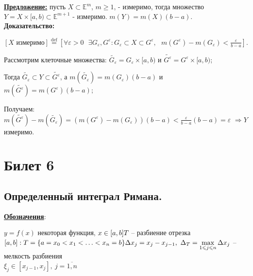 \documentclass[a4paper,12pt]{article} %
\renewcommand {\leq}{\leqslant}
\begin{document}
	\underline{\textbf{Предложение:}} пусть $X \subset \mathbb{E}^m$, $m \geqslant 1$, - измеримо, тогда множество $Y = X\times [a, b) \subset \mathbb{E}^{m + 1}$ - измеримо. $m(Y) = m(X)(b - a)$.\\
	
	\textbf{Доказательство:}
	
	$\left[X \text{ измеримо}\right] \stackrel{\text{def}}{=} \left[\forall \varepsilon > 0\text{ }\exists G_{\varepsilon}, G^{\varepsilon}: G_{\varepsilon}\subset X\subset G^{\varepsilon}, \text{ } m(G^{\varepsilon}) - m(G_{\varepsilon}) < \frac{\varepsilon}{b - a}\right]$.
	
	\vspace{2mm}
	
	Рассмотрим клеточные множества: $\widetilde{G_{\varepsilon}} = G_{\varepsilon}\times [a, b)$ и $\widetilde{G^{\varepsilon}} = G^{\varepsilon}\times [a, b)$;
	
	\vspace{2mm}
	
	Тогда $\widetilde{G_{\varepsilon}} \subset Y \subset \widetilde{G^{\varepsilon}}$, а $m(\widetilde{G_{\varepsilon}}) = m(G_{\varepsilon})(b-a)$ и $m(\widetilde{G^{\varepsilon}}) = m(G^{\varepsilon})(b-a)$;
	
	Получаем: $m(\widetilde{G^{\varepsilon}}) - m(\widetilde{G_{\varepsilon}}) = (m(G^{\varepsilon}) - m(G_{\varepsilon}))(b-a) < \frac{\varepsilon}{b-a}(b-a) = \varepsilon$ $\Rightarrow Y$ измеримо.
	
	
	
	\newpage
	\section{Билет 6}
	
	\subsection{Определенный интеграл Римана.}
	\underline{\textbf{Обозначения}}:
	
	$y = f(x)$ некоторая функция, $x \in [a,b]\\T$ -- разбиение отрезка $[a,b]: T = \{a = x_0 < x_1 < {\dots} < x_n = b \}\\\Delta x_j = x_j - x_{j-1},~\Delta_T = \max\limits_{1\leq j\leq n}\Delta x_j$ -- мелкость разбиения\\ $\xi_j \in [x_{j-1},x_j],~j = \overline{1,n}$\\
	
\end{document}

